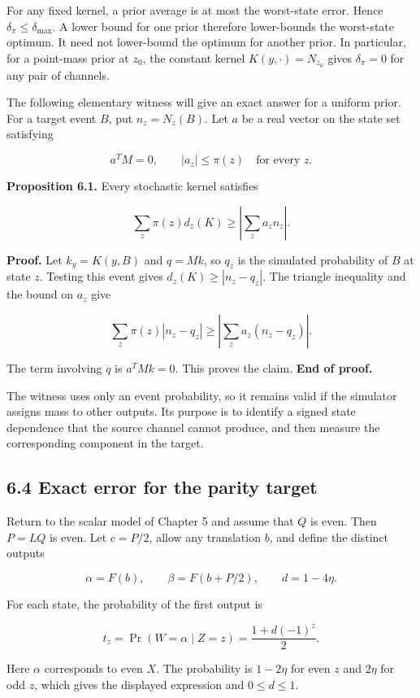 \documentclass[
]{article}
\begin{document}
For any fixed kernel, a prior average is at most the worst-state error.
Hence \(\delta_\pi\le\delta_{\max}\). A lower bound for one prior
therefore lower-bounds the worst-state optimum. It need not lower-bound
the optimum for another prior. In particular, for a point-mass prior at
\(z_0\), the constant kernel \(K(y,\cdot)=N_{z_0}\) gives
\(\delta_\pi=0\) for any pair of channels.

The following elementary witness will give an exact answer for a uniform
prior. For a target event \(B\), put \(n_z=N_z(B)\). Let \(a\) be a real
vector on the state set satisfying

\[
a^TM=0,\qquad |a_z|\le\pi(z)\quad\text{for every }z.
\]

\textbf{Proposition 6.1.} Every stochastic kernel satisfies

\[
\sum_z\pi(z)d_z(K)\ge\left|\sum_z a_zn_z\right|.
\]

\textbf{Proof.} Let \(k_y=K(y,B)\) and \(q=Mk\), so \(q_z\) is the
simulated probability of \(B\) at state \(z\). Testing this event gives
\(d_z(K)\ge|n_z-q_z|\). The triangle inequality and the bound on \(a_z\)
give

\[
\sum_z\pi(z)|n_z-q_z|
\ge\left|\sum_z a_z(n_z-q_z)\right|.
\]

The term involving \(q\) is \(a^TMk=0\). This proves the claim.
\textbf{End of proof.}

The witness uses only an event probability, so it remains valid if the
simulator assigns mass to other outputs. Its purpose is to identify a
signed state dependence that the source channel cannot produce, and then
measure the corresponding component in the target.

\subsection{6.4 Exact error for the parity
target}\label{exact-error-for-the-parity-target}

Return to the scalar model of Chapter 5 and assume that \(Q\) is even.
Then \(P=LQ\) is even. Let \(c=P/2\), allow any translation \(b\), and
define the distinct outputs

\[
\alpha=F(b),\qquad\beta=F(b+P/2),\qquad d=1-4\eta.
\]

For each state, the probability of the first output is

\[
t_z=\Pr(W=\alpha\mid Z=z)
=\frac{1+d(-1)^z}{2}.
\]

Here \(\alpha\) corresponds to even \(X\). The probability is
\(1-2\eta\) for even \(z\) and \(2\eta\) for odd \(z\), which gives the
displayed expression and \(0\le d\le1\).
\end{document}
